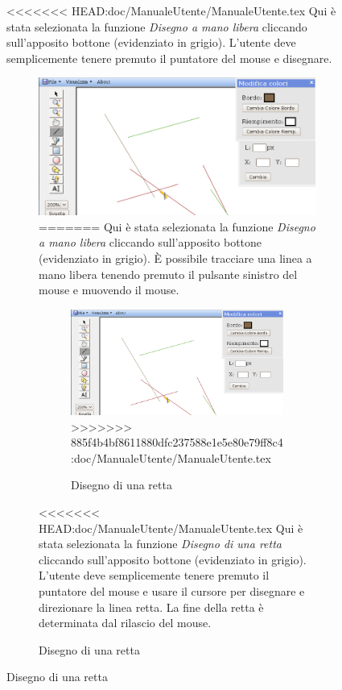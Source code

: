 \begin{figure}[!ht]
\vspace{300pt}
<<<<<<< HEAD:doc/ManualeUtente/ManualeUtente.tex
Qui \`e stata selezionata la funzione \textit{Disegno a mano libera} cliccando sull'apposito bottone (evidenziato in grigio). L'utente deve semplicemente tenere premuto il puntatore del mouse e disegnare. \\

\begin{figure}[!ht]
\centering
\includegraphics[scale=0.4]{images/linea.png}
=======
Qui \`e stata selezionata la funzione \textit{Disegno a mano libera} cliccando sull'apposito bottone (evidenziato in grigio). \`E possibile tracciare una linea a mano libera tenendo premuto il pulsante sinistro del mouse e muovendo il mouse.

\begin{figure}[!ht]
\centering
\includegraphics[scale=1]{images/linea.png}
>>>>>>> 885f4b4bf8611880dfc237588e1e5e80e79ff8c4:doc/ManualeUtente/ManualeUtente.tex
\caption{Disegno di una retta}
\end{figure} 

\vspace{300pt}
<<<<<<< HEAD:doc/ManualeUtente/ManualeUtente.tex
Qui \`e stata selezionata la funzione \textit{Disegno di una retta} cliccando sull'apposito bottone (evidenziato in grigio). L'utente deve semplicemente tenere premuto il puntatore del mouse e usare il cursore per disegnare e direzionare la linea retta. La fine della retta \`e determinata dal rilascio del mouse. \\


\end{figure}
\end{figure}
